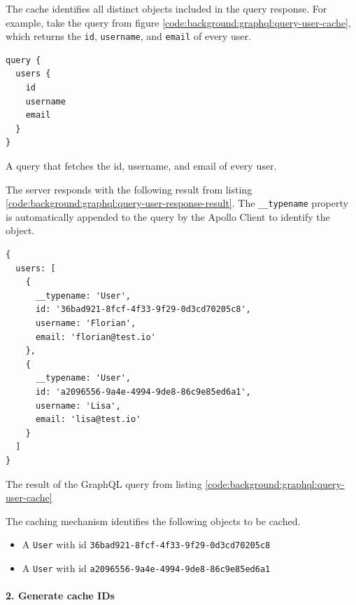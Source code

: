 The cache identifies all distinct objects included in the query response. For example, take the query from figure \ref{code:background:graphql:query-user-cache}, which returns the \texttt{id}, \texttt{username}, and \texttt{email} of every user.

\ifshowListings
\begin{listing}[H]
    \begin{verbatim}
query {
  users {
    id
    username
    email
  }
}
    \end{verbatim}
    \caption{A query that fetches the id, username, and email of every user.}\label{code:background:graphql:query-user-cache}
\end{listing}
\fi

The server responds with the following result from listing \ref{code:background:graphql:query-user-response-result}. The \texttt{\_\_typename} property is automatically appended to the query by the Apollo Client to identify the object.

\ifshowListings
\begin{listing}[H]
    \begin{verbatim}
{
  users: [
    {
      __typename: 'User',
      id: '36bad921-8fcf-4f33-9f29-0d3cd70205c8',
      username: 'Florian',
      email: 'florian@test.io'
    },
    {
      __typename: 'User',
      id: 'a2096556-9a4e-4994-9de8-86c9e85ed6a1',
      username: 'Lisa',
      email: 'lisa@test.io'
    }
  ]
}
    \end{verbatim}
    \caption{The result of the GraphQL query from listing \ref{code:background:graphql:query-user-cache}}\label{code:background:graphql:query-user-response-result}
\end{listing}
\fi

The caching mechanism identifies the following objects to be cached.

\begin{itemize}
    \item A \texttt{User} with id \texttt{36bad921-8fcf-4f33-9f29-0d3cd70205c8}
    \item A \texttt{User} with id \texttt{a2096556-9a4e-4994-9de8-86c9e85ed6a1}
\end{itemize}

\paragraph{2. Generate cache IDs}\label{paragraph:background:graphql:apollo-server-client:data-normalization:generate-cache-ids}

